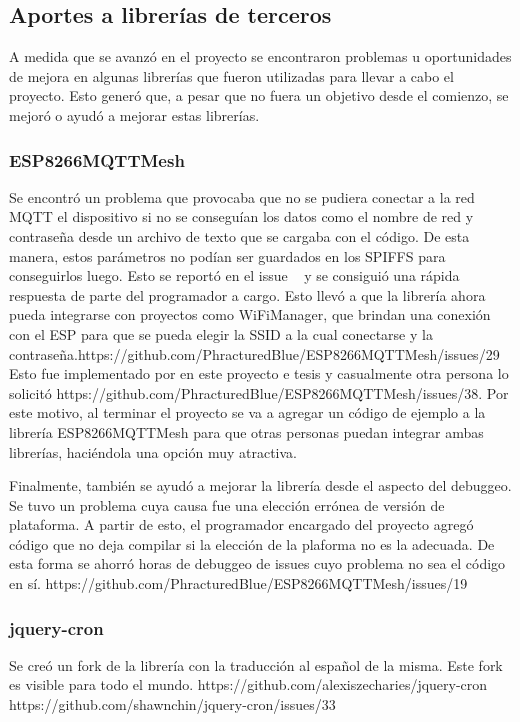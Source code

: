 \subsection{Aportes a librerías de terceros}

A medida que se avanzó en el proyecto se encontraron problemas u oportunidades de mejora en algunas librerías que fueron utilizadas para llevar a cabo el proyecto. Esto generó que, a pesar que no fuera un objetivo desde el comienzo, se mejoró o ayudó a mejorar estas librerías.

\subsubsection{ESP8266MQTTMesh}

Se encontró un problema que provocaba que no se pudiera conectar a la red MQTT el dispositivo si no se conseguían los datos como el nombre de red y contraseña desde un archivo de texto que se cargaba con el código. De esta manera, estos parámetros no podían ser guardados en los SPIFFS para conseguirlos luego. Esto se reportó en el issue ~\cite{Topic2} y se consiguió una rápida respuesta de parte del programador a cargo. Esto llevó a que la librería ahora pueda integrarse con proyectos como WiFiManager, que brindan una conexión con el ESP para que se pueda elegir la SSID a la cual conectarse y la contraseña.https://github.com/PhracturedBlue/ESP8266MQTTMesh/issues/29  Esto fue implementado por en este proyecto e tesis y casualmente otra persona lo solicitó https://github.com/PhracturedBlue/ESP8266MQTTMesh/issues/38. Por este motivo, al terminar el proyecto se va a agregar un código de ejemplo a la librería  ESP8266MQTTMesh para que otras personas puedan integrar ambas librerías, haciéndola una opción muy atractiva. 

Finalmente, también se ayudó a mejorar la librería desde el aspecto del debuggeo. Se tuvo un problema cuya causa fue una elección errónea de versión de plataforma. A partir de esto, el programador encargado del proyecto agregó código que no deja compilar si la elección de la plaforma no es la adecuada. De esta forma se ahorró horas de debuggeo de issues cuyo problema no sea el código en sí. https://github.com/PhracturedBlue/ESP8266MQTTMesh/issues/19 

\subsubsection{jquery-cron}

Se creó un fork de la librería con la traducción al español de la misma. Este fork es visible para todo el mundo. https://github.com/alexiszecharies/jquery-cron https://github.com/shawnchin/jquery-cron/issues/33 

